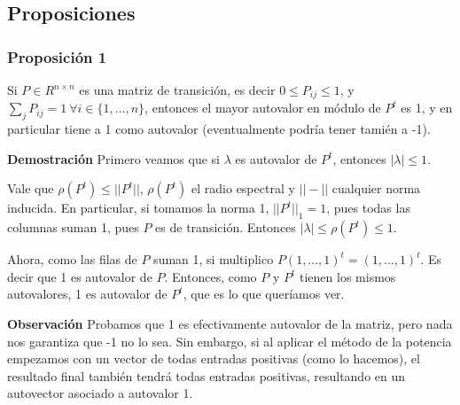 \subsection{Proposiciones}

\subsubsection{Proposición 1}
\label{subsub:prop1}
Si $P \in R^{n\times n}$ es una matriz de transición, es decir $0 \leq P_{ij} \leq 1$, y $\sum_j P_{ij} = 1 \ \forall i\in\{1,...,n\}$, entonces el mayor autovalor en módulo de $P^t$ es 1, y en particular tiene a 1 como autovalor (eventualmente podría tener tamién a -1).

\textbf{Demostración} Primero veamos que si $\lambda$ es autovalor de $P^t$, entonces $|\lambda| \leq 1$.

Vale que $\rho(P^t) \leq ||P^t||$, $\rho(P^t)$ el radio espectral y $||-||$ cualquier norma inducida. En particular, si tomamos la norma 1, $||P^t||_1 = 1$, pues todas las columnas suman 1, pues $P$ es de transición. Entonces $|\lambda| \leq \rho(P^t) \leq 1$.

Ahora, como las filas de $P$ suman 1, si multiplico $P (1, ..., 1)^t = (1, ..., 1)^t$. Es decir que 1 es autovalor de $P$. Entonces, como $P$ y $P^t$ tienen los mismos autovalores, 1 es autovalor de $P^t$, que es lo que queríamos ver.

\textbf{Observación} Probamos que 1 es efectivamente autovalor de la matriz, pero nada nos garantiza que -1 no lo sea. Sin embargo, si al aplicar el método de la potencia empezamos con un vector de todas entradas positivas (como lo hacemos), el resultado final también tendrá todas entradas positivas, resultando en un autovector asociado a autovalor 1.



\newpage
\printbibliography



